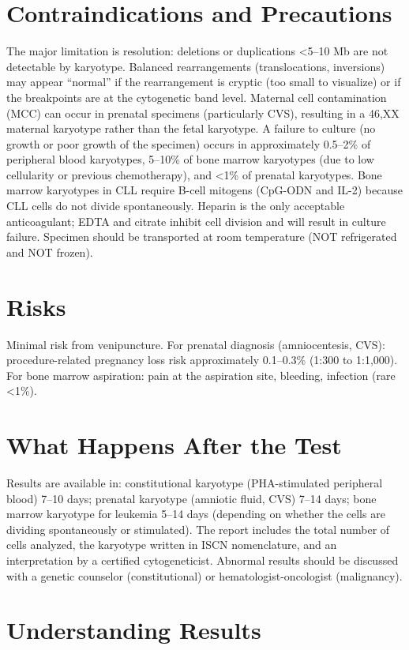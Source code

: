 \section*{Contraindications and Precautions}
The major limitation is resolution: deletions or duplications <5--10 Mb are not detectable by karyotype. Balanced rearrangements (translocations, inversions) may appear ``normal'' if the rearrangement is cryptic (too small to visualize) or if the breakpoints are at the cytogenetic band level. Maternal cell contamination (MCC) can occur in prenatal specimens (particularly CVS), resulting in a 46,XX maternal karyotype rather than the fetal karyotype. A failure to culture (no growth or poor growth of the specimen) occurs in approximately 0.5--2\% of peripheral blood karyotypes, 5--10\% of bone marrow karyotypes (due to low cellularity or previous chemotherapy), and <1\% of prenatal karyotypes. Bone marrow karyotypes in CLL require B-cell mitogens (CpG-ODN and IL-2) because CLL cells do not divide spontaneously. Heparin is the only acceptable anticoagulant; EDTA and citrate inhibit cell division and will result in culture failure. Specimen should be transported at room temperature (NOT refrigerated and NOT frozen).

\section*{Risks}
Minimal risk from venipuncture. For prenatal diagnosis (amniocentesis, CVS): procedure-related pregnancy loss risk approximately 0.1--0.3\% (1:300 to 1:1,000). For bone marrow aspiration: pain at the aspiration site, bleeding, infection (rare <1\%).

\section*{What Happens After the Test}
Results are available in: constitutional karyotype (PHA-stimulated peripheral blood) 7--10 days; prenatal karyotype (amniotic fluid, CVS) 7--14 days; bone marrow karyotype for leukemia 5--14 days (depending on whether the cells are dividing spontaneously or stimulated). The report includes the total number of cells analyzed, the karyotype written in ISCN nomenclature, and an interpretation by a certified cytogeneticist. Abnormal results should be discussed with a genetic counselor (constitutional) or hematologist-oncologist (malignancy).

\section*{Understanding Results}

